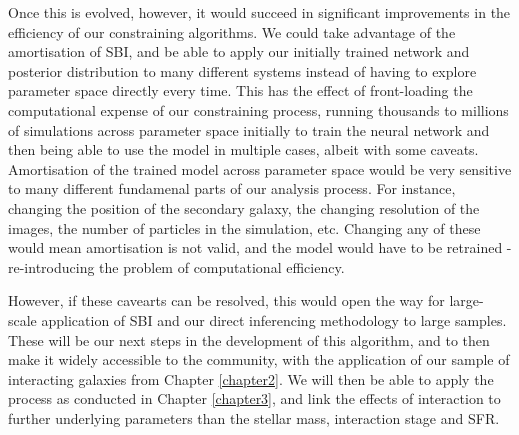 Once this is evolved, however, it would succeed in significant improvements in the efficiency of our constraining algorithms. We could take advantage of the amortisation of SBI, and be able to apply our initially trained network and posterior distribution to many different systems instead of having to explore parameter space directly every time. This has the effect of front-loading the computational expense of our constraining process, running thousands to millions of simulations across parameter space initially to train the neural network and then being able to use the model in multiple cases, albeit with some caveats. Amortisation of the trained model across parameter space would be very sensitive to many different fundamenal parts of our analysis process. For instance, changing the position of the secondary galaxy, the changing resolution of the images, the number of particles in the simulation, etc. Changing any of these would mean amortisation is not valid, and the model would have to be retrained - re-introducing the problem of computational efficiency. 

However, if these cavearts can be resolved, this would open the way for large-scale application of SBI and our direct inferencing methodology to large samples. These will be our next steps in the development of this algorithm, and to then make it widely accessible to the community, with the application of our sample of interacting galaxies from Chapter \ref{chapter2}. We will then be able to apply the process as conducted in Chapter \ref{chapter3}, and link the effects of interaction to further underlying parameters than the stellar mass, interaction stage and SFR. 